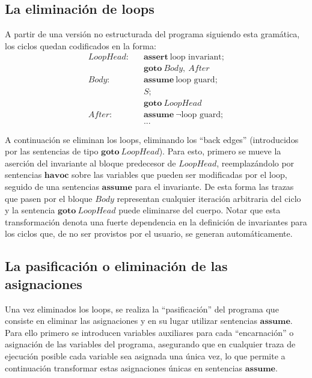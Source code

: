 \documentclass[12pt, a4paper, openany, fleqn]{book}
\begin{document}
    \subsection*{La eliminación de loops}
    A partir de una versión no estructurada del programa siguiendo esta gramática, los ciclos quedan codificados en la forma:
    \begin{align*}
        LoopHead:\;\;\;&\textbf{assert}\ \text{loop invariant};\\
                       &\textbf{goto}\ Body,\ After \\
        Body:\;\;\;&\textbf{assume}\ \text{loop guard};\\
                   &S;\\
                   &\textbf{goto}\ LoopHead \\
        After:\;\;\;&\textbf{assume}\ \lnot \text{loop guard};\\
                    & ...
    \end{align*}

    A continuación se eliminan los loops, eliminando los ``back edges'' (introducidos por las sentencias de tipo $\textbf{goto}\ LoopHead$). Para esto, primero se mueve la aserción del invariante al bloque predecesor de $LoopHead$, reemplazándolo por sentencias $\textbf{havoc}$ sobre las variables que pueden ser modificadas por el loop, seguido de una sentencias $\textbf{assume}$ para el invariante. De esta forma las trazas que pasen por el bloque $Body$ representan cualquier iteración arbitraria del ciclo y la sentencia $\textbf{goto}\ LoopHead$ puede eliminarse del cuerpo.
    Notar que esta transformación denota una fuerte dependencia en la definición de invariantes para los ciclos que, de no ser provistos por el usuario, se generan automáticamente.

    \subsection*{La pasificación o eliminación de las asignaciones}
    Una vez eliminados los loops, se realiza la ``pasificación'' del programa que consiste en eliminar las asignaciones y en su lugar utilizar sentencias $\textbf{assume}$. Para ello primero se introducen variables auxiliares para cada ``encarnación'' o asignación de las variables del programa, asegurando que en cualquier traza de ejecución posible cada variable sea asignada una única vez, lo que permite a continuación transformar estas asignaciones únicas en sentencias $\textbf{assume}$.
\end{document}
